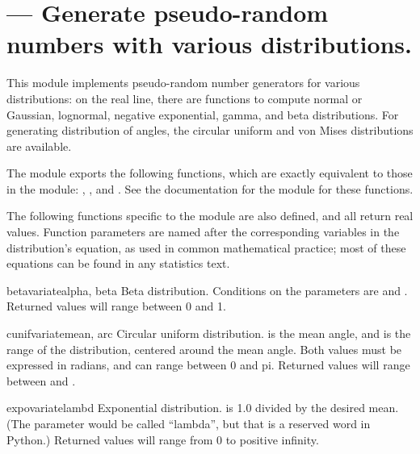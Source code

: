 \section{ ---
         Generate pseudo-random numbers with various distributions.}



This module implements pseudo-random number generators for various
distributions: on the real line, there are functions to compute normal
or Gaussian, lognormal, negative exponential, gamma, and beta
distributions.  For generating distribution of angles, the circular
uniform and von Mises distributions are available.

The module exports the following functions, which are exactly
equivalent to those in the  module:
, ,  and
.  See the documentation for the 
module for these functions.

The following functions specific to the  module are also
defined, and all return real values.  Function parameters are named
after the corresponding variables in the distribution's equation, as
used in common mathematical practice; most of these equations can be
found in any statistics text.

\begin{funcdesc}{betavariate}{alpha, beta}
Beta distribution.  Conditions on the parameters are
 and .
Returned values will range between 0 and 1.
\end{funcdesc}

\begin{funcdesc}{cunifvariate}{mean, arc}
Circular uniform distribution.   is the mean angle, and
 is the range of the distribution, centered around the mean
angle.  Both values must be expressed in radians, and can range
between 0 and pi.  Returned values will range between
 and .
\end{funcdesc}

\begin{funcdesc}{expovariate}{lambd}
Exponential distribution.   is 1.0 divided by the desired
mean.  (The parameter would be called ``lambda'', but that is a
reserved word in Python.)  Returned values will range from 0 to
positive infinity.
\end{funcdesc}

